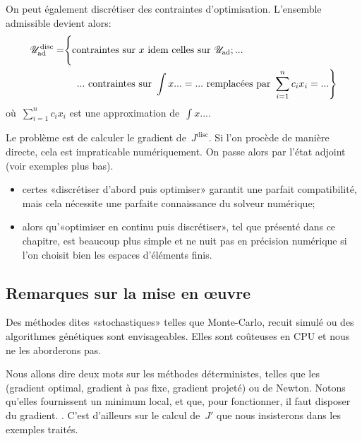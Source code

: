 On peut également discrétiser des contraintes d'optimisation. L'ensemble admissible devient alors:
\begin{equation}
\begin{split} 
\mathscr{U}^{\text{disc}}_{\text{ad}} = &\Bigg\{ \text{contraintes sur } x \text{ idem celles sur } \mathscr{U}_{\text{ad}}; ...\\  
& \left. \quad ... \text{ contraintes sur } \int x...=... \text{ remplacées par } \displaystyle\sum_{i=1}^n c_ix_i = ... \right\}
\end{split}
\end{equation}
où~$\sum_{i=1}^n c_ix_i$ est une approximation de~$\int x...$.

Le problème est de calculer le gradient de~$J^{\text{disc}}$. Si l'on procède de manière directe, cela est impraticable numériquement. On passe alors par l'état adjoint (voir exemples plus bas).

\medskip
{}
\begin{itemize}
   \item certes «discrétiser d'abord puis optimiser» garantit une parfait compatibilité, mais cela nécessite une parfaite connaissance du solveur numérique;
   \item alors qu'«optimiser en continu puis discrétiser», tel que présenté dans ce chapitre, est beaucoup plus simple et ne nuit pas en précision numérique si l'on choisit bien les espaces d'éléments finis.
\end{itemize}


\medskip
\subsection{Remarques sur la mise en œuvre}

Des méthodes dites «stochastiques» telles que Monte-Carlo, recuit simulé ou des algorithmes génétiques sont envisageables. Elles sont coûteuses en CPU et nous ne les aborderons pas.

Nous allons dire deux mots sur les méthodes déterministes, telles que les  (gradient optimal, gradient à pas fixe, gradient projeté) ou de Newton. Notons qu'elles fournissent un minimum local, et que, pour fonctionner, il faut disposer du gradient. . C'est d'ailleurs sur le calcul de~$J'$ que nous insisterons dans les exemples traités.

